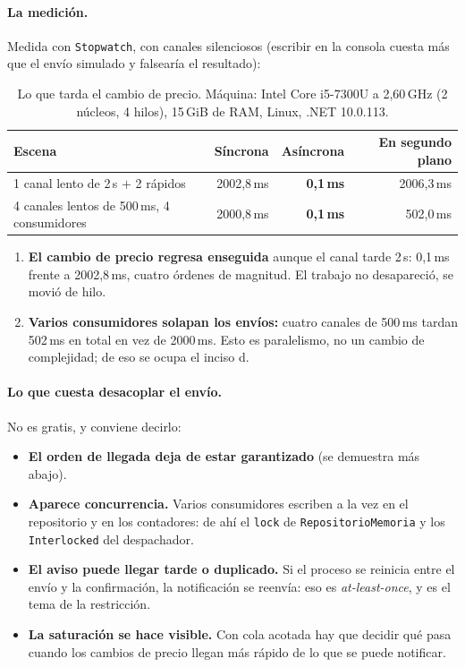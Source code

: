 \paragraph{La medición.}
Medida con \texttt{Stopwatch}, con canales silenciosos (escribir en la consola cuesta más
que el envío simulado y falsearía el resultado):

\begin{table}[H]
\centering
\small
\begin{tabular}{lrrr}
\toprule
\textbf{Escena} & \textbf{Síncrona} & \textbf{Asíncrona} & \textbf{En segundo plano} \\
\midrule
1 canal lento de 2\,s $+$ 2 rápidos & 2002,8\,ms & \textbf{0,1\,ms} & 2006,3\,ms \\
4 canales lentos de 500\,ms, 4 consumidores & 2000,8\,ms & \textbf{0,1\,ms} & 502,0\,ms \\
\bottomrule
\end{tabular}
\caption{Lo que tarda el cambio de precio. Máquina: Intel Core i5-7300U a 2,60\,GHz
(2 núcleos, 4 hilos), 15\,GiB de RAM, Linux, .NET 10.0.113.}
\end{table}

\begin{enumerate}
  \item \textbf{El cambio de precio regresa enseguida} aunque el canal tarde 2\,s: 0,1\,ms
        frente a 2002,8\,ms, cuatro órdenes de magnitud. El trabajo no desapareció, se movió
        de hilo.
  \item \textbf{Varios consumidores solapan los envíos:} cuatro canales de 500\,ms tardan
        502\,ms en total en vez de 2000\,ms. Esto es paralelismo, no un cambio de
        complejidad; de eso se ocupa el inciso d.
\end{enumerate}

\paragraph{Lo que cuesta desacoplar el envío.}
No es gratis, y conviene decirlo:

\begin{itemize}
  \item \textbf{El orden de llegada deja de estar garantizado} (se demuestra más abajo).
  \item \textbf{Aparece concurrencia.} Varios consumidores escriben a la vez en el
        repositorio y en los contadores: de ahí el \texttt{lock} de
        \texttt{RepositorioMemoria} y los \texttt{Interlocked} del despachador.
  \item \textbf{El aviso puede llegar tarde o duplicado.} Si el proceso se reinicia entre el
        envío y la confirmación, la notificación se reenvía: eso es \emph{at-least-once}, y
        es el tema de la restricción.
  \item \textbf{La saturación se hace visible.} Con cola acotada hay que decidir qué pasa
        cuando los cambios de precio llegan más rápido de lo que se puede notificar.
\end{itemize}

